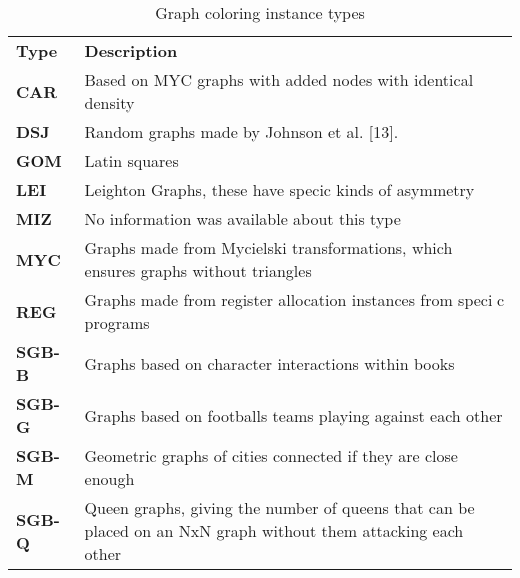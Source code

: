\documentclass{sig-alternate}
\begin{document}
\section*{}
\begin{table}
\caption{Graph coloring instance types}
\label{my-label}
\begin{tabular}{ll}
\textbf{Type} & \textbf{Description} \\
\textbf{CAR}   & Based on MYC graphs with added nodes with identical density                                                    \\
\textbf{DSJ}   & Random graphs made by Johnson et al. {[}13{]}.                                                                 \\
\textbf{GOM}   & Latin squares                                                                                                  \\
\textbf{LEI}   & Leighton Graphs, these have specic kinds of asymmetry                                                          \\
\textbf{MIZ}   & No information was available about this type                                                                   \\
\textbf{MYC}   & Graphs made from Mycielski transformations, which ensures graphs without triangles                             \\
\textbf{REG}   & Graphs made from register allocation instances from specic programs                                           \\
\textbf{SGB-B} & Graphs based on character interactions within books                                                            \\
\textbf{SGB-G} & Graphs based on footballs teams playing against each other                                                     \\
\textbf{SGB-M} & Geometric graphs of cities connected if they are close enough                                                  \\
\textbf{SGB-Q} & Queen graphs, giving the number of queens that can be placed on an NxN graph without them attacking each other
\end{tabular}
\end{table}
\end{document}
